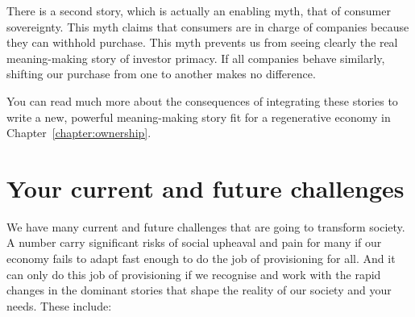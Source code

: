 There is a second story, which is actually an enabling myth, that of consumer sovereignty. This myth claims that consumers are in charge of companies because they can withhold purchase. This myth prevents us from seeing clearly the real meaning\hyp{}making story of investor primacy. If all companies behave similarly, shifting our purchase from one to another makes no difference. 


You can read much more about the consequences of integrating these stories to write a new, powerful meaning\hyp{}making story fit for a regenerative economy in Chapter~\ref{chapter:ownership}. 
\section{Your current and future challenges}
We have many current and future challenges that are going to transform society. A number carry significant risks of social upheaval and pain for many if our economy fails to adapt fast enough to do the job of provisioning for all. And it can only do this job of provisioning if we recognise and work with the rapid changes in the dominant stories that shape the reality of our society and your needs. These include:


